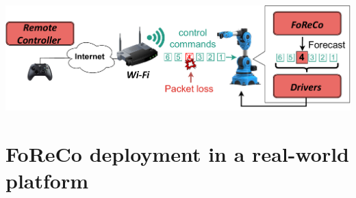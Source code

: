 \documentclass[a0,portrait]{a0poster}
\begin{document}
\begin{multicols}{2}
\begin{center}\vspace{1cm}
    \includegraphics[width=\linewidth]{figures/experimental-setup-standalone.pdf}
    \label{fig:foreco}
\end{center}\vspace{1cm}








\section*{FoReCo deployment in a real-world platform}
\label{sec:deep}


\end{multicols}
\end{document}

